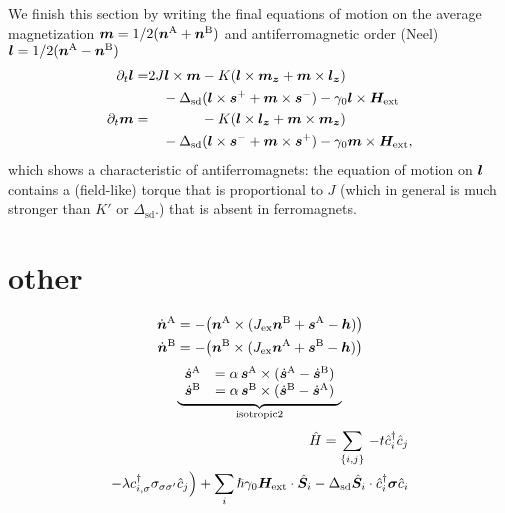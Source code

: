 We finish this section by writing the final equations of motion on the average magnetization $\boldsymbol{m}=1/2(\boldsymbol{n}^\text{A}+\boldsymbol{n}^\text{B})$ and antiferromagnetic order (Neel) $\boldsymbol{l}=1/2(\boldsymbol{n}^\text{A}-\boldsymbol{n}^\text{B})$ 
\begin{align}
    \partial_t \bb{l} = & 2J \bb{l}\times\bb{m} - K  (\bb{l}\times \bb{m_z}+\bb{m}\times\bb{l_z}) \nonumber\\
     & \quad-\Delta_\text{sd} (\bb{l}\times\bb{s}^++\bb{m}\times \bb{s}^-) -\gamma_0\bb{l}\times\bb{H}_\text{ext}\label{intro:eq:dl3}\\
    \partial_t \bb{m} = & \phantom{2J \bb{l}\times\bb{m}} -K (\bb{l} \times \bb{l_z}+\bb{m}\times\bb{m_z} )  \nonumber\\
    & \quad-\Delta_\text{sd}(\bb{l}\times\bb{s}^-+\bb{m}\times\bb{s}^+) -\gamma_0\bb{m}\times\bb{H}_\text{ext},\label{intro:eq:dm3}
\end{align}
which shows a characteristic of antiferromagnets: the equation of motion on $\boldsymbol{l}$ contains a (field-like) torque that is proportional to $J$ (which in general is much stronger than $K'$ or $\Delta_\text{sd}$.) that is absent in ferromagnets. 
\section{other}
\begin{align}
    \dot{\boldsymbol{n}}^\text{A} &= -\big(\boldsymbol{n}^\text{A}\times(J_\text{ex}\boldsymbol{n}^\text{B}+\boldsymbol{s}^\text{A}-\boldsymbol{h})\big)\\
    \dot{\boldsymbol{n}}^\text{B} &= -\big(\boldsymbol{n}^\text{B}\times(J_\text{ex}\boldsymbol{n}^\text{A}+\boldsymbol{s}^\text{B}-\boldsymbol{h})\big)
\end{align}
\begin{align}
\underbrace{
\begin{array}{cc}
    \dot{\boldsymbol{s}}^\text{A} &= \alpha\, \boldsymbol{s}^\text{A}\times (\dot{\boldsymbol{s}}^\text{A}-\dot{\boldsymbol{s}}^\text{B})\\
        \dot{\boldsymbol{s}}^\text{B} &= \alpha\, \boldsymbol{s}^\text{B}\times (\dot{\boldsymbol{s}}^\text{B}-\dot{\boldsymbol{s}}^\text{A})
\end{array}
}_{\text{isotropic2}}
\end{align}
\begin{align}
    \hat{H}
        = \sum_{{\{i,j\}}}\, -t \hat{c}_i^\dagger\hat{c}_j\\
        -\lambda c_{i,\sigma}^\dagger {\sigma}_{\sigma\sigma'}\hat{c}_j\Big)+\sum_i \hslash\gamma_0\boldsymbol{H}_\text{ext}\cdot\hat{\boldsymbol{S}}_i-\Delta_\text{sd}\hat{\boldsymbol{S}}_i\cdot\hat{c}_i^\dagger\boldsymbol{\sigma}\hat{c}_i
    \label{intro:eq:Hm2}
\end{align}

